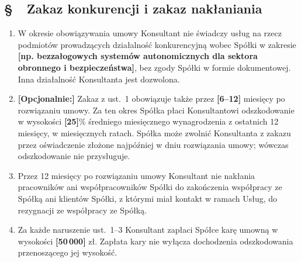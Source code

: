\documentclass[11pt,a4paper]{report}
\newcounter{paragraf}
\newcommand{\paragraf}[1]{%
  \refstepcounter{paragraf}%
  \Needspace{5\baselineskip}%
  \subsection*{\S~\theparagraf\ #1}%
}
\newenvironment{ContractClause}[1]{\paragraf{#1}}{\par}
\newcommand{\field}[1]{\textbf{[#1]}}
\begin{document}
\begin{ContractClause}{Zakaz konkurencji i zakaz nakłaniania}
\label{b:konkurencja}
\begin{enumerate}
  \item W okresie obowiązywania umowy Konsultant nie świadczy usług na rzecz podmiotów prowadzących działalność konkurencyjną wobec Spółki w zakresie \field{np. bezzałogowych systemów autonomicznych dla sektora obronnego i bezpieczeństwa}, bez zgody Spółki w formie dokumentowej. Inna działalność Konsultanta jest dozwolona.
  \item \field{Opcjonalnie:} Zakaz z ust.~1 obowiązuje także przez \field{6--12} miesięcy po rozwiązaniu umowy. Za ten okres Spółka płaci Konsultantowi odszkodowanie w wysokości \field{25}\% średniego miesięcznego wynagrodzenia z ostatnich 12 miesięcy, w miesięcznych ratach. Spółka może zwolnić Konsultanta z zakazu przez oświadczenie złożone najpóźniej w dniu rozwiązania umowy; wówczas odszkodowanie nie przysługuje.
  \item Przez 12 miesięcy po rozwiązaniu umowy Konsultant nie nakłania pracowników ani współpracowników Spółki do zakończenia współpracy ze Spółką ani klientów Spółki, z którymi miał kontakt w ramach Usług, do rezygnacji ze współpracy ze Spółką.
  \item Za każde naruszenie ust.~1--3 Konsultant zapłaci Spółce karę umowną w wysokości \field{50\,000} zł. Zapłata kary nie wyłącza dochodzenia odszkodowania przenoszącego jej wysokość.
\end{enumerate}
\end{ContractClause}
\end{document}
